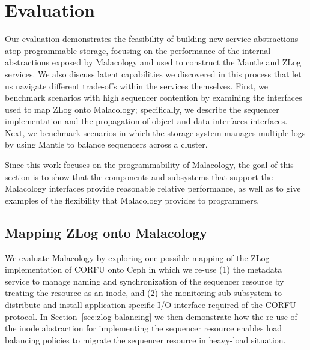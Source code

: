 \section{Evaluation}
\label{sec:evaluation} 


Our evaluation demonstrates the feasibility of building new service
abstractions atop programmable storage, focusing on the performance of the
internal abstractions exposed by Malacology and used to construct the Mantle
and ZLog services. We also discuss latent capabilities we discovered in this
process that let us navigate different trade-offs within the services
themselves. First, we benchmark scenarios with high sequencer contention by
examining the interfaces used to map ZLog onto Malacology; specifically, we
describe the sequencer implementation and the propagation of object and data
interfaces interfaces.  Next, we benchmark scenarios in which the storage
system manages multiple logs by using Mantle to balance sequencers across a
cluster.


Since this work focuses on the programmability of Malacology, the goal of this
section is to show that the components and subsystems that support the
Malacology interfaces provide reasonable relative performance, as well as to
give examples of the flexibility that Malacology provides to programmers.


\subsection{Mapping ZLog onto Malacology}
\label{sec:mapping-zlog-onto-malacology}

We evaluate Malacology by exploring one possible mapping of the ZLog
implementation of CORFU onto Ceph in which we re-use (1) the metadata service
to manage naming and synchronization of the sequencer resource by treating the
resource as an inode, and (2) the monitoring sub-subsystem to distribute and
install application-specific I/O interface required of the CORFU protocol. In
Section~\ref{sec:zlog-balancing} we then demonstrate how the re-use of the
inode abstraction for implementing the sequencer resource enables load
balancing policies to migrate the sequencer resource in heavy-load situation.

